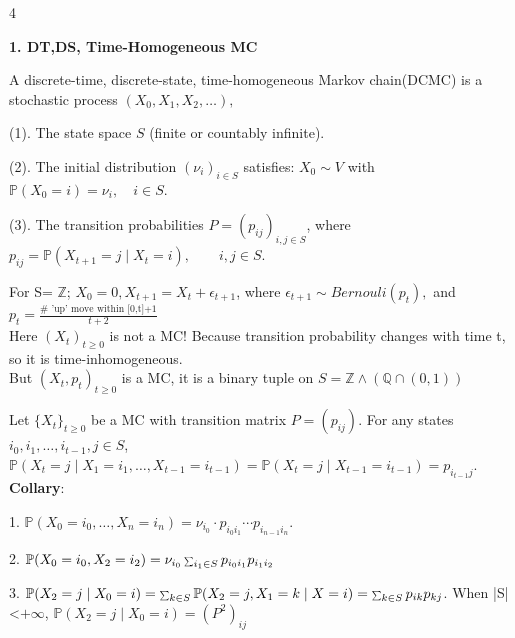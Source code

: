 \documentclass[a4paper, landscape]{article}
\newcommand{\topic}[1]{\par\medskip\textbf{#1}\par}
\newcommand{\subtopic}[1]{\par\textbf{#1}}
\newcommand{\smallsum}{\mathop{\scalebox{0.65}{$\sum$}}\nolimits}
\renewcommand{\topic}[1]{\par\medskip\noindent\colorbox{highlightcolor}{\parbox{\dimexpr\columnwidth-2\fboxsep\relax}{\textbf{#1}}}\par}
\renewcommand{\subtopic}[1]{\par\textbf{\color{blue}{#1}}} %
\begin{document}
\pagestyle{empty}

\fontsize{6}{6}\selectfont

\begin{multicols}{4}


\topic{1. DT,DS, Time-Homogeneous MC}
\subtopic{Definition:} A discrete-time, discrete-state, time-homogeneous Markov chain(DCMC) is a stochastic process
$(X_0, X_1, X_2, \dots),$ 
\par (1). The state space $S$ (finite or countably infinite).
\par (2). The initial distribution $(\nu_i)_{i\in S}$ satisfies: $X_0 \sim V$ with $\mathbb P(X_0 = i) = \nu_i,\quad i \in S$.
\par (3). The transition probabilities $P = (p_{ij})_{i,j\in S}$, where $ p_{ij} = \mathbb P(X_{t+1} = j \mid X_t = i), \qquad i,j \in S $.

\subtopic{Non-Example} For S= $\mathbb Z$; $X_0=0, X_{t+1}=X_t+\epsilon_{t+1}$, where $\epsilon_{t+1}\sim Bernouli(p_t),$ and $p_t=\frac{\#\text{ 'up' move within [0,t]+1}}{t+2}$\\
Here $(X_t)_{t\geq0}$ is not a MC! Because transition probability changes with time t, so it is time-inhomogeneous. \\
But $(X_t, p_t)_{t\geq0}$ is a MC, it is a binary tuple on $S =\mathbb Z \land(\mathbb Q \cap(0,1))$ 

\subtopic{Markov-Property} Let $\{X_t\}_{t\ge0}$ be a MC with transition matrix $P=(p_{ij})$. For any states $i_0,i_1,\dots,i_{t-1},j \in S$,\\
$\mathbb P(X_t=j \mid X_1=i_1, \dots, X_{t-1}=i_{t-1})
=\mathbb P(X_t=j \mid X_{t-1}=i_{t-1})
=p_{i_{t-1}j}.$\\
\textbf{Collary}:
\par 1. $\mathbb P(X_0=i_0, \dots, X_n=i_n) =\nu_{i_0}\cdot p_{i_0 i_1}{\cdots} p_{i_{n-1} i_n}$.
\par 2. $\mathbb P(X_0=i_0, X_2=i_2)= \nu_{i_0}\smallsum_{i_1\in S} p_{i_0 i_1} p_{i_1 i_2}$
\par 3. $\mathbb P(X_2=j \mid X_0=i)=\smallsum_{k \in S} \mathbb P(X_2=j, X_1=k \mid X=i) =\smallsum_{k \in S} p_{ik}p_{kj} $.
When |S|<$+\infty$, $\mathbb P(X_2=j \mid X_0=i)=(P^2)_{i j}$


\end{multicols}
\end{document}
